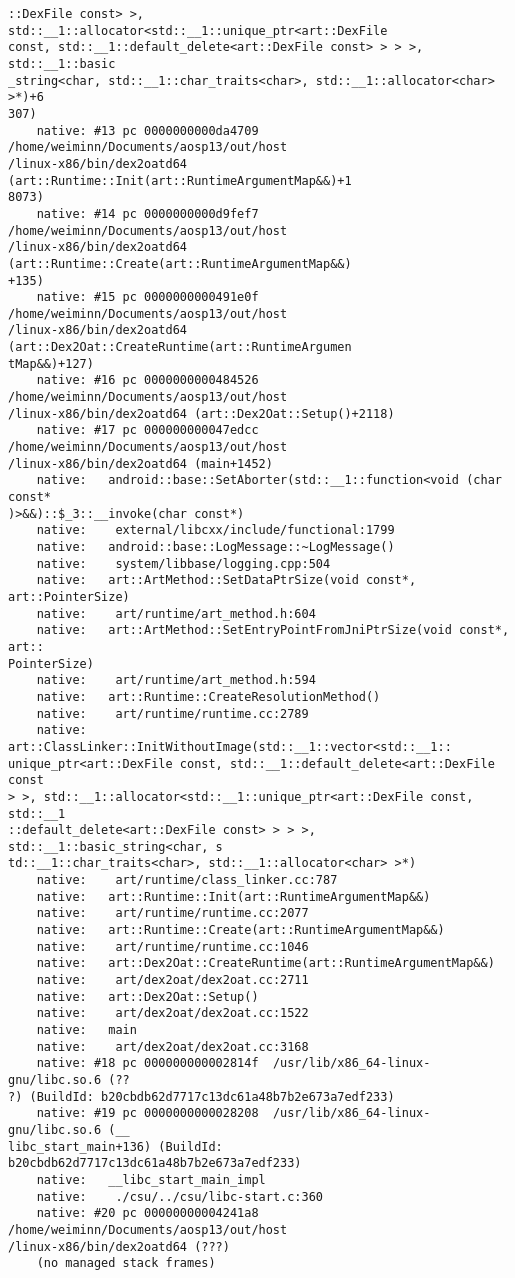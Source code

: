 \begin{lstlisting}
::DexFile const> >, std::__1::allocator<std::__1::unique_ptr<art::DexFile 
const, std::__1::default_delete<art::DexFile const> > > >, std::__1::basic
_string<char, std::__1::char_traits<char>, std::__1::allocator<char> >*)+6
307)
    native: #13 pc 0000000000da4709  /home/weiminn/Documents/aosp13/out/host
/linux-x86/bin/dex2oatd64 (art::Runtime::Init(art::RuntimeArgumentMap&&)+1
8073)
    native: #14 pc 0000000000d9fef7  /home/weiminn/Documents/aosp13/out/host
/linux-x86/bin/dex2oatd64 (art::Runtime::Create(art::RuntimeArgumentMap&&)
+135)
    native: #15 pc 0000000000491e0f  /home/weiminn/Documents/aosp13/out/host
/linux-x86/bin/dex2oatd64 (art::Dex2Oat::CreateRuntime(art::RuntimeArgumen
tMap&&)+127)
    native: #16 pc 0000000000484526  /home/weiminn/Documents/aosp13/out/host
/linux-x86/bin/dex2oatd64 (art::Dex2Oat::Setup()+2118)
    native: #17 pc 000000000047edcc  /home/weiminn/Documents/aosp13/out/host
/linux-x86/bin/dex2oatd64 (main+1452)
    native:   android::base::SetAborter(std::__1::function<void (char const*
)>&&)::$_3::__invoke(char const*)
    native:    external/libcxx/include/functional:1799
    native:   android::base::LogMessage::~LogMessage()
    native:    system/libbase/logging.cpp:504
    native:   art::ArtMethod::SetDataPtrSize(void const*, art::PointerSize)
    native:    art/runtime/art_method.h:604
    native:   art::ArtMethod::SetEntryPointFromJniPtrSize(void const*, art::
PointerSize)
    native:    art/runtime/art_method.h:594
    native:   art::Runtime::CreateResolutionMethod()
    native:    art/runtime/runtime.cc:2789
    native:   art::ClassLinker::InitWithoutImage(std::__1::vector<std::__1::
unique_ptr<art::DexFile const, std::__1::default_delete<art::DexFile const
> >, std::__1::allocator<std::__1::unique_ptr<art::DexFile const, std::__1
::default_delete<art::DexFile const> > > >, std::__1::basic_string<char, s
td::__1::char_traits<char>, std::__1::allocator<char> >*)
    native:    art/runtime/class_linker.cc:787
    native:   art::Runtime::Init(art::RuntimeArgumentMap&&)
    native:    art/runtime/runtime.cc:2077
    native:   art::Runtime::Create(art::RuntimeArgumentMap&&)
    native:    art/runtime/runtime.cc:1046
    native:   art::Dex2Oat::CreateRuntime(art::RuntimeArgumentMap&&)
    native:    art/dex2oat/dex2oat.cc:2711
    native:   art::Dex2Oat::Setup()
    native:    art/dex2oat/dex2oat.cc:1522
    native:   main
    native:    art/dex2oat/dex2oat.cc:3168
    native: #18 pc 000000000002814f  /usr/lib/x86_64-linux-gnu/libc.so.6 (??
?) (BuildId: b20cbdb62d7717c13dc61a48b7b2e673a7edf233)
    native: #19 pc 0000000000028208  /usr/lib/x86_64-linux-gnu/libc.so.6 (__
libc_start_main+136) (BuildId: b20cbdb62d7717c13dc61a48b7b2e673a7edf233)
    native:   __libc_start_main_impl
    native:    ./csu/../csu/libc-start.c:360
    native: #20 pc 00000000004241a8  /home/weiminn/Documents/aosp13/out/host
/linux-x86/bin/dex2oatd64 (???)
    (no managed stack frames)


\end{lstlisting}
